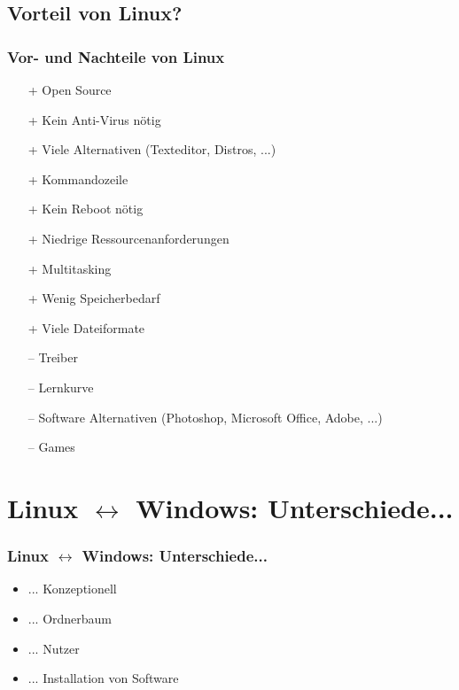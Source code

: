 \documentclass{beamer}
\begin{document}
	    \subsection{Vorteil von Linux?}
	        \begin{frame}
          		\frametitle{Vor- und Nachteile von Linux}
        		\begin{minipage}{0.8\textwidth}
        		    \begin{itemize}
        		        \item[+] Open Source
        		        \item[+] Kein Anti-Virus nötig
        		        \item[+] Viele Alternativen (Texteditor, Distros, ...)
        		        \item[+] Kommandozeile
        		        \item[+] Kein Reboot nötig
        		        \item[+] Niedrige Ressourcenanforderungen
        		        \item[+] Multitasking
        		        \item[+] Wenig Speicherbedarf
        		        \item[+] Viele Dateiformate
        		        \item[--] Treiber
        		        \item[--] Lernkurve
        		        \item[--] Software Alternativen (Photoshop, Microsoft Office,  Adobe, ...)
        		        \item[--] Games
        		    \end{itemize}
        		\end{minipage}%
        	\end{frame}
        	
    \section{Linux $\leftrightarrow$ Windows: Unterschiede...}
        \begin{frame}
      		\frametitle{Linux $\leftrightarrow$ Windows: Unterschiede...}
        		\begin{center}
            		\begin{minipage}{0.44\textwidth}
            		    \begin{itemize}
            		        \item ... Konzeptionell
            		        \item ... Ordnerbaum
            		        \item ... Nutzer
            		        \item ... Installation von Software
            		    \end{itemize}
            		\end{minipage}%
        		\end{center}
    	\end{frame}
\end{document}
